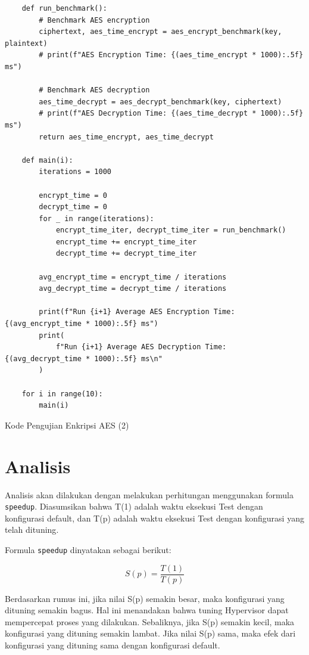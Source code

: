 \begin{listing}[H]
    \begin{verbatim}
    def run_benchmark():
        # Benchmark AES encryption
        ciphertext, aes_time_encrypt = aes_encrypt_benchmark(key, plaintext)
        # print(f"AES Encryption Time: {(aes_time_encrypt * 1000):.5f} ms")

        # Benchmark AES decryption
        aes_time_decrypt = aes_decrypt_benchmark(key, ciphertext)
        # print(f"AES Decryption Time: {(aes_time_decrypt * 1000):.5f} ms")
        return aes_time_encrypt, aes_time_decrypt

    def main(i):
        iterations = 1000

        encrypt_time = 0
        decrypt_time = 0
        for _ in range(iterations):
            encrypt_time_iter, decrypt_time_iter = run_benchmark()
            encrypt_time += encrypt_time_iter
            decrypt_time += decrypt_time_iter

        avg_encrypt_time = encrypt_time / iterations
        avg_decrypt_time = decrypt_time / iterations

        print(f"Run {i+1} Average AES Encryption Time: {(avg_encrypt_time * 1000):.5f} ms")
        print(
            f"Run {i+1} Average AES Decryption Time: {(avg_decrypt_time * 1000):.5f} ms\n"
        )

    for i in range(10):
        main(i)

    \end{verbatim}
    \caption{Kode Pengujian Enkripsi AES (2)}
    \label{code:pengujian_enkripsi_aes_2}
\end{listing}
\section{Analisis}
Analisis akan dilakukan dengan melakukan perhitungan menggunakan formula \texttt{speedup}. Diasumsikan bahwa T(1) adalah waktu eksekusi Test dengan konfigurasi default, dan T(p) adalah waktu eksekusi Test dengan konfigurasi yang telah dituning\cite{beuwolfCetin}. 

Formula \texttt{speedup} dinyatakan sebagai berikut:

\[S(p) = \frac{T(1)}{T(p)}\]

Berdasarkan rumus ini, jika nilai S(p) semakin besar, maka konfigurasi yang dituning semakin bagus. Hal ini menandakan bahwa tuning Hypervisor dapat mempercepat proses yang dilakukan. Sebaliknya, jika S(p) semakin kecil, maka konfigurasi yang dituning semakin lambat. Jika nilai S(p) sama, maka efek dari konfigurasi yang dituning sama dengan konfigurasi default.

